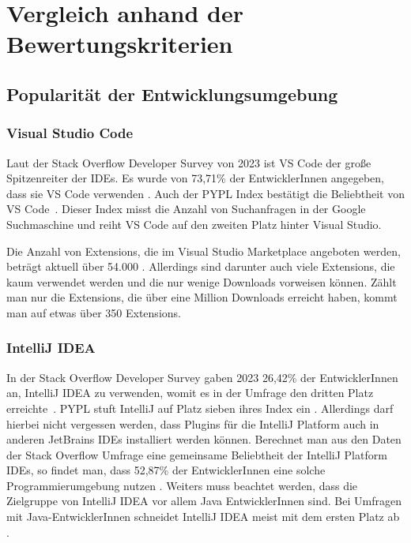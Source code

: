 \chapter{Vergleich anhand der Bewertungskriterien}
\label{cha:Vergleich}

\section{Popularität der Entwicklungsumgebung}
\label{sec:Vergleich_Popularität}

\subsection{Visual Studio Code}

Laut der Stack Overflow Developer Survey von 2023 ist
VS Code der große Spitzenreiter der IDEs. Es wurde von
73,71\% der EntwicklerInnen angegeben,
dass sie VS Code verwenden \cite{StackOverflowSurvey2023}.
Auch der PYPL Index bestätigt die Beliebtheit von VS Code~\cite{PYPL}.
Dieser Index misst die Anzahl von Suchanfragen in der Google Suchmaschine
und reiht VS Code auf den zweiten Platz hinter Visual Studio.

Die Anzahl von Extensions, die im Visual Studio Marketplace angeboten werden,
beträgt aktuell über 54.000 \cite{VSCodeMarketplace}. Allerdings sind 
darunter auch viele Extensions, die kaum verwendet werden und die nur
wenige Downloads vorweisen können. Zählt man nur die 
Extensions, die über eine Million Downloads erreicht haben,
kommt man auf etwas über 350 Extensions.

\subsection{IntelliJ IDEA}

In der Stack Overflow Developer Survey gaben 2023
26,42\% der EntwicklerInnen an, IntelliJ IDEA zu verwenden,
womit es in der Umfrage den dritten Platz erreichte~\cite{StackOverflowSurvey2023}.
PYPL stuft IntelliJ auf Platz sieben ihres Index ein \cite{PYPL}.
Allerdings darf hierbei nicht vergessen werden, dass Plugins
für die IntelliJ Platform auch in anderen JetBrains IDEs installiert
werden können. Berechnet man aus den Daten der Stack Overflow Umfrage
eine gemeinsame Beliebtheit der IntelliJ Platform IDEs, so findet man,
dass 52,87\% der EntwicklerInnen eine solche Programmierumgebung nutzen \cite{StackOverflowSurvey}.
Weiters muss beachtet werden, dass die Zielgruppe von IntelliJ IDEA
vor allem Java EntwicklerInnen sind. Bei Umfragen mit Java-EntwicklerInnen 
schneidet IntelliJ IDEA meist mit dem ersten Platz ab \cite{JRebelIDEs,JRebelDeveloperProductivityReport,BetterprojectsfasterPouplarityIndex}.

